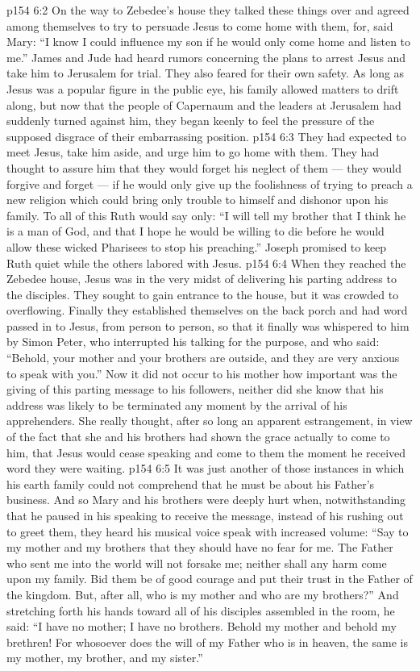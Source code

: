 \vs p154 6:2 On the way to Zebedee’s house they talked these things over and agreed among themselves to try to persuade Jesus to come home with them, for, said Mary: “I know I could influence my son if he would only come home and listen to me.” James and Jude had heard rumors concerning the plans to arrest Jesus and take him to Jerusalem for trial. They also feared for their own safety. As long as Jesus was a popular figure in the public eye, his family allowed matters to drift along, but now that the people of Capernaum and the leaders at Jerusalem had suddenly turned against him, they began keenly to feel the pressure of the supposed disgrace of their embarrassing position.
\vs p154 6:3 They had expected to meet Jesus, take him aside, and urge him to go home with them. They had thought to assure him that they would forget his neglect of them --- they would forgive and forget --- if he would only give up the foolishness of trying to preach a new religion which could bring only trouble to himself and dishonor upon his family. To all of this Ruth would say only: “I will tell my brother that I think he is a man of God, and that I hope he would be willing to die before he would allow these wicked Pharisees to stop his preaching.” Joseph promised to keep Ruth quiet while the others labored with Jesus.
\vs p154 6:4 When they reached the Zebedee house, Jesus was in the very midst of delivering his parting address to the disciples. They sought to gain entrance to the house, but it was crowded to overflowing. Finally they established themselves on the back porch and had word passed in to Jesus, from person to person, so that it finally was whispered to him by Simon Peter, who interrupted his talking for the purpose, and who said: “Behold, your mother and your brothers are outside, and they are very anxious to speak with you.” Now it did not occur to his mother how important was the giving of this parting message to his followers, neither did she know that his address was likely to be terminated any moment by the arrival of his apprehenders. She really thought, after so long an apparent estrangement, in view of the fact that she and his brothers had shown the grace actually to come to him, that Jesus would cease speaking and come to them the moment he received word they were waiting.
\vs p154 6:5 It was just another of those instances in which his earth family could not comprehend that he must be about his Father’s business. And so Mary and his brothers were deeply hurt when, notwithstanding that he paused in his speaking to receive the message, instead of his rushing out to greet them, they heard his musical voice speak with increased volume: \textcolor{ubdarkred}{“Say to my mother and my brothers that they should have no fear for me. The Father who sent me into the world will not forsake me; neither shall any harm come upon my family. Bid them be of good courage and put their trust in the Father of the kingdom. But, after all, who is my mother and who are my brothers?”} And stretching forth his hands toward all of his disciples assembled in the room, he said: \textcolor{ubdarkred}{“I have no mother; I have no brothers. Behold my mother and behold my brethren! For whosoever does the will of my Father who is in heaven, the same is my mother, my brother, and my sister.”}
